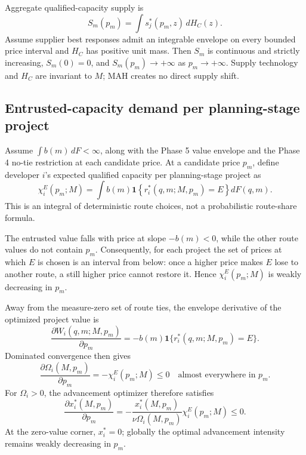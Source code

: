 Aggregate qualified-capacity supply is
\begin{equation}
  S_m(p_m)
  =
  \int s_j^*(p_m,z)\,dH_C(z).
  \label{eq:p06-aggregate-supply}
\end{equation}
Assume supplier best responses admit an integrable envelope on every
bounded price interval and \(H_C\) has positive unit mass. Then \(S_m\) is continuous and
strictly increasing, \(S_m(0)=0\), and
\(S_m(p_m)\to+\infty\) as \(p_m\to+\infty\). Supply technology and
\(H_C\) are invariant to \(M\); MAH creates no direct supply shift.

\subsection{Entrusted-capacity demand per planning-stage project}
\label{subsec:p06-project-demand}

Assume \(\int b(m)\,dF<\infty\), along with the Phase 5 value envelope
and the Phase 4 no-tie restriction at each candidate price. At a candidate
price \(p_m\), define developer \(i\)'s expected qualified
capacity per planning-stage project as
\begin{equation}
  \chi_i^E(p_m;M)
  =
  \int
  b(m)
  \mathbf 1
  \left\{
    r_i^*(q,m;M,p_m)=E
  \right\}
  dF(q,m).
  \label{eq:p06-entrusted-capacity}
\end{equation}
This is an integral of deterministic route choices, not a probabilistic
route-share formula.

The entrusted value falls with price at slope \(-b(m)<0\), while the other
route values do not contain \(p_m\). Consequently, for each project the set
of prices at which \(E\) is chosen is an interval from below: once a higher
price makes \(E\) lose to another route, a still higher price cannot restore
it. Hence \(\chi_i^E(p_m;M)\) is weakly decreasing in \(p_m\).

Away from the measure-zero set of route ties, the envelope derivative of the
optimized project value is
\[
  \frac{\partial W_i(q,m;M,p_m)}{\partial p_m}
  =
  -b(m)
  \mathbf 1\{r_i^*(q,m;M,p_m)=E\}.
\]
Dominated convergence then gives
\begin{equation}
  \frac{\partial\Omega_i(M,p_m)}{\partial p_m}
  =
  -\chi_i^E(p_m;M)
  \leq0
  \quad\text{almost everywhere in }p_m.
  \label{eq:p06-omega-price-envelope}
\end{equation}
For \(\Omega_i>0\), the advancement optimizer therefore satisfies
\begin{equation}
  \frac{\partial x_i^*(M,p_m)}{\partial p_m}
  =
  -\frac{x_i^*(M,p_m)}
  {\nu\Omega_i(M,p_m)}
  \chi_i^E(p_m;M)
  \leq0.
  \label{eq:p06-advancement-price-response}
\end{equation}
At the zero-value corner, \(x_i^*=0\); globally the optimal advancement
intensity remains weakly decreasing in \(p_m\).

